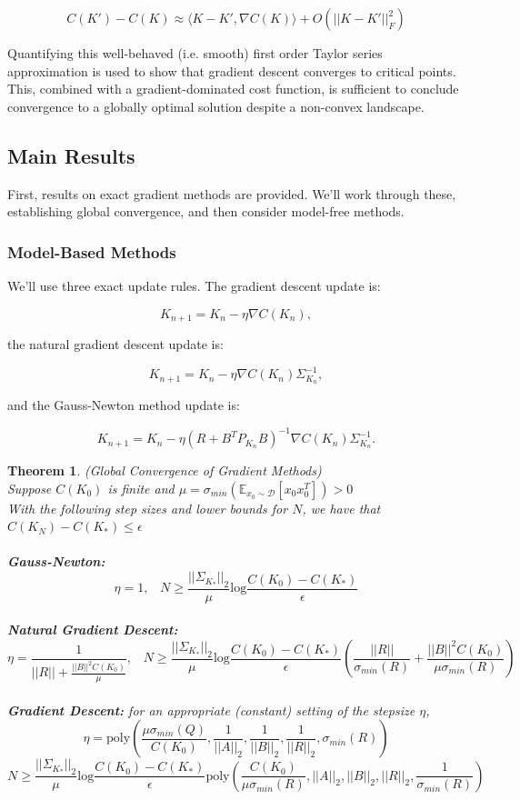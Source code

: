 \documentclass{article}[12pt]
\newtheorem{theorem}{Theorem}
\def\E{\mathbb{E}}
\def \E{\mathbb E}
\begin{document}
$$C(K') - C(K) \approx \langle K - K', \nabla C(K) \rangle + O(||K-K'||_F^2)$$

Quantifying this well-behaved (i.e. smooth) first order Taylor series approximation is used to show that gradient descent converges to critical points. This, combined with a gradient-dominated cost function, is sufficient to conclude convergence to a globally optimal solution despite a non-convex landscape.

\subsection{Main Results}
First, results on exact gradient methods are provided. We'll work through these, establishing global convergence, and then consider model-free methods.

\subsubsection{Model-Based Methods}

We'll use three exact update rules. The gradient descent update is:

$$K_{n+1} = K_n -\eta \nabla C(K_n),$$

the natural gradient descent update is:

$$K_{n+1} = K_n -\eta \nabla C(K_n)\Sigma_{K_n}^{-1},$$

and the Gauss-Newton method update is:

$$K_{n+1} = K_n -\eta (R+B^TP_{K_n}B)^{-1}\nabla C(K_n)\Sigma_{K_n}^{-1}.$$

\begin{theorem} (Global Convergence of Gradient Methods) \\
Suppose $C(K_0)$ is finite and $\mu = \sigma_{min}(\E_{x_0\sim \mathcal{D}}[x_0x_0^T])>0$\\
With the following step sizes and lower bounds for $N$, we have that $C(K_N) - C(K_*)\leq \epsilon$\\
\\
\textbf{Gauss-Newton:} 
$$\eta = 1, \; \; \;N \geq \frac{||\Sigma_{K_*}||_2}{\mu}\text{log}\frac{C(K_0)-C(K_*)}{\epsilon}$$
\\
\textbf{Natural Gradient Descent:} 
$$\eta = \frac{1}{||R|| + \frac{||B||^2C(K_0)}{\mu}}, \; \; \; N \geq \frac{||\Sigma_{K_*}||_2}{\mu}\text{log}\frac{C(K_0)-C(K_*)}{\epsilon} \left(\frac{||R||}{\sigma_{min}(R)}+\frac{||B||^2C(K_0)}{\mu \sigma_{min}(R)}\right)$$
\\
\textbf{Gradient Descent:} for an appropriate (constant) setting of the stepsize $\eta$,
$$\eta = \text{poly}\left(\frac{\mu \sigma_{min}(Q)}{C(K_0)},\frac{1}{||A||_2},\frac{1}{||B||_2},\frac{1}{||R||_2},\sigma_{min}(R)\right)$$
$$N \geq \frac{||\Sigma_{K_*}||_2}{\mu}\text{log}\frac{C(K_0)-C(K_*)}{\epsilon} \text{poly}\left(\frac{C(K_0)}{\mu \sigma_{min}(R)},||A||_2,||B||_2,||R||_2,\frac{1}{\sigma_{min}(R)}\right)$$
\end{theorem}
\end{document}
